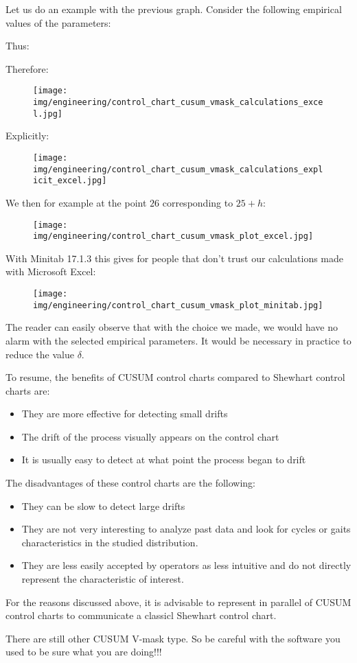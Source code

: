 	Let us do an example with the previous graph. Consider the following empirical values of the parameters:
	
	Thus:
	
	Therefore:
	\begin{figure}[H]
		\centering
		\texttt{[image: img/engineering/control\_chart\_cusum\_vmask\_calculations\_excel.jpg]}
	\end{figure}
	Explicitly:
	\begin{figure}[H]
		\centering
		\texttt{[image: img/engineering/control\_chart\_cusum\_vmask\_calculations\_explicit\_excel.jpg]}
	\end{figure}
	We then for example at the point $26$ corresponding to $25 + h$:
	\begin{figure}[H]
		\centering
		\texttt{[image: img/engineering/control\_chart\_cusum\_vmask\_plot\_excel.jpg]}
	\end{figure}
	With Minitab 17.1.3 this gives for people that don't trust our calculations made with Microsoft Excel:
	\begin{figure}[H]
		\centering
		\texttt{[image: img/engineering/control\_chart\_cusum\_vmask\_plot\_minitab.jpg]}
	\end{figure}
	The reader can easily observe that with the choice we made, we would have no alarm with the selected empirical parameters. It would be necessary in practice to reduce the value $\delta$.

	To resume, the benefits of CUSUM control charts compared to Shewhart control charts are:
	\begin{itemize}
		\item They are more effective for detecting small drifts

		\item The drift of the process visually appears on the control chart

		\item It is usually easy to detect at what point the process began to drift
	\end{itemize}
	The disadvantages of these control charts are the following:
	\begin{itemize}
		\item They can be slow to detect large drifts

		\item They are not very interesting to analyze past data and look for cycles or gaits characteristics in the studied distribution.

		\item They are less easily accepted by operators as less intuitive and do not directly represent the characteristic of interest.
	\end{itemize}
	For the reasons discussed above, it is advisable to represent in parallel of CUSUM control charts to communicate a classicl Shewhart control chart.
	\begin{tcolorbox}[title=Remark,colframe=black,arc=10pt]
	There are still other CUSUM V-mask type. So be careful with the software you used to be sure what you are doing!!!
	\end{tcolorbox}
	
